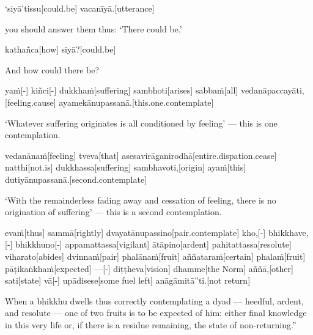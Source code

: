 \begin{samepage}
\begingl[glneveryline={\PaliGlossA,\PaliGlossB}]
‘siyā’tissu[could.be] vacanīyā.[utterance]
\endgl
\nopagebreak
\linespread{0.5}
\begin{spacin}{0.2}
{\PaliGlossFT you should answer them thus: ‘There could be.’}
\end{spacin}
\vskip 12pt
\end{samepage}
\begin{samepage}
\begingl[glneveryline={\PaliGlossA,\PaliGlossB}]
kathañca[how] siyā?[could.be]
\endgl
\nopagebreak
\linespread{0.5}
\begin{spacin}{0.2}
{\PaliGlossFT And how could there be?}
\end{spacin}
\vskip 12pt
\end{samepage}
\begin{samepage}
\begingl[glneveryline={\PaliGlossA,\PaliGlossB}]
yaṁ[-] kiñci[-] dukkhaṁ[suffering] sambhoti[arises] sabbaṁ[all] vedanāpaccayāti,[feeling.cause] ayamekānupassanā.[this.one.contemplate]
\endgl
\nopagebreak
\linespread{0.5}
\begin{spacin}{0.2}
{\PaliGlossFT ‘Whatever suffering originates is all conditioned by feeling’ — this is one contemplation.}
\end{spacin}
\vskip 12pt
\end{samepage}
\begin{samepage}
\begingl[glneveryline={\PaliGlossA,\PaliGlossB}]
vedanānaṁ[feeling] tveva[that] asesavirāganirodhā[entire.dispation.cease] natthi[not.is] dukkhassa[suffering] sambhavoti,[origin] ayaṁ[this] dutiyānupassanā.[second.contemplate]
\endgl
\nopagebreak
\linespread{0.5}
\begin{spacin}{0.2}
{\PaliGlossFT ‘With the remainderless fading away and cessation of feeling, there is no origination of suffering’ — this is a second contemplation.}
\end{spacin}
\vskip 12pt
\end{samepage}
\begin{samepage}
\begingl[glneveryline={\PaliGlossA,\PaliGlossB}]
evaṁ[thus] sammā[rightly] dvayatānupassino[pair.contemplate] kho,[-] bhikkhave,[-] bhikkhuno[-] appamattassa[vigilant] ātāpino[ardent] pahitattassa[resolute] viharato[abides] dvinnaṁ[pair] phalānaṁ[fruit] aññataraṁ[certain] phalaṁ[fruit] pāṭikaṅkhaṁ[expected] —[-] diṭṭheva[vision] dhamme[the Norm] aññā,[other] sati[state] vā[-] upādisese[some fuel left] anāgāmitā”ti.[not return]
\endgl
\nopagebreak
\linespread{0.5}
\begin{spacin}{0.2}
{\PaliGlossFT When a bhikkhu dwells thus correctly contemplating a dyad — heedful, ardent, and resolute — one of two fruits is to be expected of him: either final knowledge in this very life or, if there is a residue remaining, the state of non-returning.”}
\end{spacin}
\vskip 12pt
\end{samepage}
